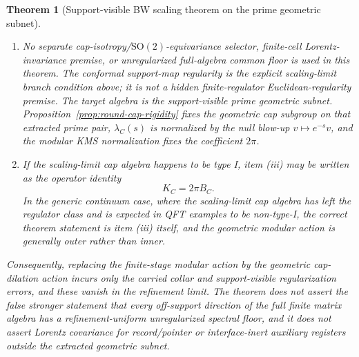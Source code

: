 \documentclass[11pt]{article}
\newtheorem{theorem}{Theorem}[section]
\begin{document}
\begin{theorem}[Support-visible BW scaling theorem on the prime geometric subnet]
\begin{enumerate}[label=\textup{(\roman*)},leftmargin=2em]
\item No separate cap-isotropy/\(\mathrm{SO}(2)\)-equivariance selector, finite-cell Lorentz-invariance premise, or unregularized full-algebra common floor is used in this theorem. The conformal support-map regularity is the explicit scaling-limit branch condition above; it is not a hidden finite-regulator Euclidean-regularity premise. The target algebra is the support-visible prime geometric subnet. Proposition~\ref{prop:round-cap-rigidity} fixes the geometric cap subgroup on that extracted prime pair, \(\lambda_C(s)\) is normalized by the null blow-up \(v\mapsto e^{-s}v\), and the modular KMS normalization fixes the coefficient \(2\pi\).

\item If the scaling-limit cap algebra happens to be type I, item \textup{(iii)} may be written as the operator identity
\[
K_C=2\pi B_C.
\]
In the generic continuum case, where the scaling-limit cap algebra has left the regulator class and is expected in QFT examples to be non-type-I, the correct theorem statement is item \textup{(iii)} itself, and the geometric modular action is generally outer rather than inner.
\end{enumerate}

Consequently, replacing the finite-stage modular action by the geometric cap-dilation action incurs only the carried collar and support-visible regularization errors, and these vanish in the refinement limit. The theorem does not assert the false stronger statement that every off-support direction of the full finite matrix algebra has a refinement-uniform unregularized spectral floor, and it does not assert Lorentz covariance for record/pointer or interface-inert auxiliary registers outside the extracted geometric subnet.
\end{theorem}
\end{document}
